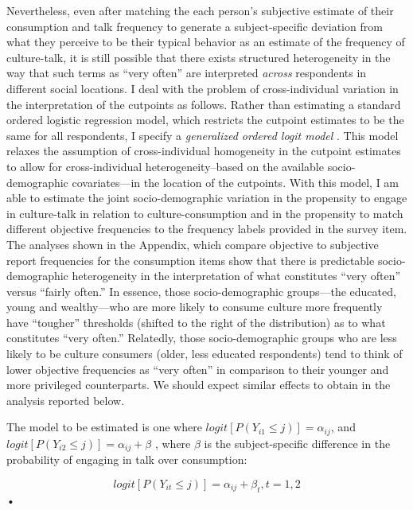 Nevertheless, even after matching the each person's subjective estimate of their consumption and talk frequency to generate a subject-specific deviation from what they perceive to be their typical behavior as an estimate of the frequency of culture-talk, it is still possible that there exists structured heterogeneity in the way that such terms as ``very often'' are interpreted \emph{across} respondents in different social locations. I deal with the problem of cross-individual variation in the interpretation of the cutpoints as follows.  Rather than estimating a standard ordered logistic regression model, which restricts the cutpoint estimates to be the same for all respondents, I specify a \emph{generalized ordered logit model} \citep{williams06}. This model relaxes the assumption of cross-individual homogeneity in the cutpoint estimates to allow for cross-individual heterogeneity--based on the available socio-demographic covariates---in the location of the cutpoints.  With this model, I am able to estimate the joint socio-demographic variation in the propensity to engage in culture-talk in relation to culture-consumption and in the propensity to match different objective frequencies to the frequency labels provided in the survey item. The analyses shown in the Appendix, which compare objective to subjective report frequencies for the consumption items show that there is predictable socio-demographic heterogeneity in the interpretation of what constitutes ``very often'' versus ``fairly often.''  In essence, those socio-demographic groups---the educated, young and wealthy---who are more likely to consume culture more frequently have ``tougher'' thresholds (shifted to the right of the distribution) as to what constitutes ``very often.''  Relatedly, those socio-demographic groups who are less likely to be culture consumers (older, less educated respondents) tend to think of lower objective frequencies as ``very often'' in comparison to their younger and more privileged counterparts.  We should expect similar effects to obtain in the analysis reported below.

The model to be estimated is one where $logit[P(Y_{i1}\leq j)]=\alpha_{ij}$, and $logit[P(Y_{i2}\leq j)]=\alpha_{ij} + \beta$ \citep[254]{agresti07}, where $\beta$ is the subject-specific difference in the probability of engaging in talk over consumption:

\begin{equation}
logit[P(Y_{it}\leq j)]=\alpha_{ij} + \beta_t, t=1,2
\label{eq:agresti1}
\end{equation}•

